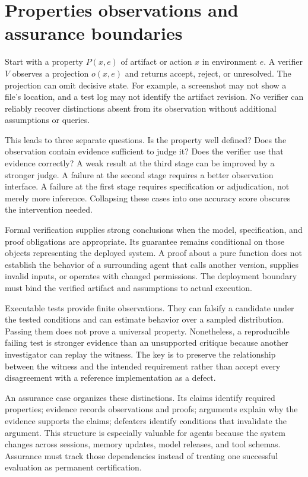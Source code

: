 \section{Properties observations and assurance boundaries}\label{sec:C25:properties}
Start with a property $P(x,e)$ of artifact or action $x$ in environment $e$. A verifier $V$ observes a projection $o(x,e)$ and returns accept, reject, or unresolved. The projection can omit decisive state. For example, a screenshot may not show a file's location, and a test log may not identify the artifact revision. No verifier can reliably recover distinctions absent from its observation without additional assumptions or queries.

This leads to three separate questions. Is the property well defined? Does the observation contain evidence sufficient to judge it? Does the verifier use that evidence correctly? A weak result at the third stage can be improved by a stronger judge. A failure at the second stage requires a better observation interface. A failure at the first stage requires specification or adjudication, not merely more inference. Collapsing these cases into one accuracy score obscures the intervention needed.

Formal verification supplies strong conclusions when the model, specification, and proof obligations are appropriate. Its guarantee remains conditional on those objects representing the deployed system. A proof about a pure function does not establish the behavior of a surrounding agent that calls another version, supplies invalid inputs, or operates with changed permissions. The deployment boundary must bind the verified artifact and assumptions to actual execution.

Executable tests provide finite observations. They can falsify a candidate under the tested conditions and can estimate behavior over a sampled distribution. Passing them does not prove a universal property. Nonetheless, a reproducible failing test is stronger evidence than an unsupported critique because another investigator can replay the witness. The key is to preserve the relationship between the witness and the intended requirement rather than accept every disagreement with a reference implementation as a defect.

An assurance case organizes these distinctions. Its claims identify required properties; evidence records observations and proofs; arguments explain why the evidence supports the claims; defeaters identify conditions that invalidate the argument. This structure is especially valuable for agents because the system changes across sessions, memory updates, model releases, and tool schemas. Assurance must track those dependencies instead of treating one successful evaluation as permanent certification.

